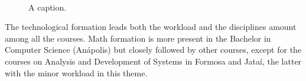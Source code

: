 \documentclass[sigconf, review]{educomp}
\begin{document}
~
\begin{figure}[!htbp]
    \centering
    \qquad
    \caption{A caption.}%
    \label{fig_themes}%
\end{figure}
The technological formation leads both the workload and the disciplines amount among all the courses.
Math formation is more present in the Bachelor in Computer Science (Anápolis) but closely followed by other courses, except for the courses on Analysis and Development of Systems in Formosa and Jataí, the latter with the minor workload in this theme.
\end{document}
